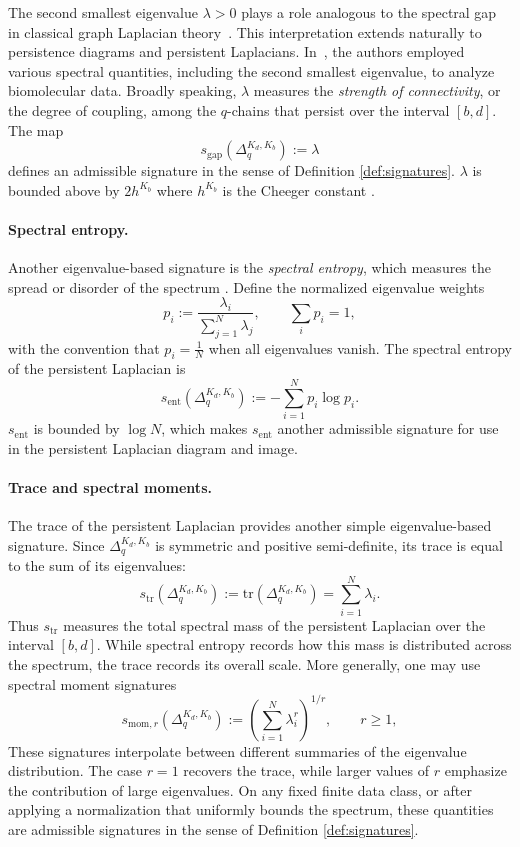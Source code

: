 \documentclass{article}
\begin{document}
The second smallest eigenvalue $\lambda > 0$ plays a role analogous to the spectral gap in classical graph Laplacian theory~\cite{Chung97, fiedler1973algebraic, spielman2012spectral}. This interpretation extends naturally to persistence diagrams and persistent Laplacians. In~\cite{chen2022persistent}, the authors employed various spectral quantities, including the second smallest eigenvalue, to analyze biomolecular data. Broadly speaking, $\lambda$ measures the \emph{strength of connectivity}, or the degree of coupling, among the $q$-chains that persist over the interval $[b,d]$. The map
\[
s_{\mathrm{gap}}(\Delta^{K_d,K_b}_q) := \lambda
\]
defines an admissible signature in the sense of Definition \ref{def:signatures}. $\lambda$ is bounded above by $2h^{K_b}$ where $h^{K_b}$ is the Cheeger constant \cite{memoli2022persistent}.

\paragraph{Spectral entropy.}
Another eigenvalue-based signature is the \emph{spectral entropy}, which measures the spread or disorder of the spectrum \cite{de2016spectral, nicolini2018thermodynamics, sun2021eigenvalue}. Define the normalized eigenvalue weights
\[
p_i := \frac{\lambda_i}{\sum_{j=1}^{N} \lambda_j}, \qquad \sum_i p_i = 1,
\]
with the convention that $p_i = \frac{1}{N}$ when all eigenvalues vanish.
The spectral entropy of the persistent Laplacian is
\[
s_{\mathrm{ent}}(\Delta^{K_d,K_b}_q)
  := - \sum_{i=1}^{N} p_i \log p_i.
\]
$s_{\mathrm{ent}}$ is bounded by $\log N$, which makes $s_{\mathrm{ent}}$ another admissible signature for use in the persistent Laplacian diagram and image.


\paragraph{Trace and spectral moments.}
The trace of the persistent Laplacian provides another simple eigenvalue-based signature. Since $\Delta^{K_d,K_b}_q$ is symmetric and positive semi-definite, its trace is equal to the sum of its eigenvalues:
\[
s_{\mathrm{tr}}(\Delta^{K_d,K_b}_q)
    := \mathrm{tr}(\Delta^{K_d,K_b}_q)
    = \sum_{i=1}^{N} \lambda_i.
\]
Thus $s_{\mathrm{tr}}$ measures the total spectral mass of the persistent Laplacian over the interval $[b,d]$. While spectral entropy records how this mass is distributed across the spectrum, the trace records its overall scale. More generally, one may use spectral moment signatures~\cite{estrada1996spectral, godsil2013algebraic, mowshowitz2014spectral}
\[
s_{\mathrm{mom},r}(\Delta^{K_d,K_b}_q)
    := \left(\sum_{i=1}^{N} \lambda_i^r\right)^{1/r},
    \qquad r \ge 1,
\]
These signatures interpolate between different summaries of the eigenvalue distribution. The case $r=1$ recovers the trace, while larger values of $r$ emphasize the contribution of large eigenvalues. On any fixed finite data class, or after applying a normalization that uniformly bounds the spectrum, these quantities are admissible signatures in the sense of Definition \ref{def:signatures}.
\end{document}
